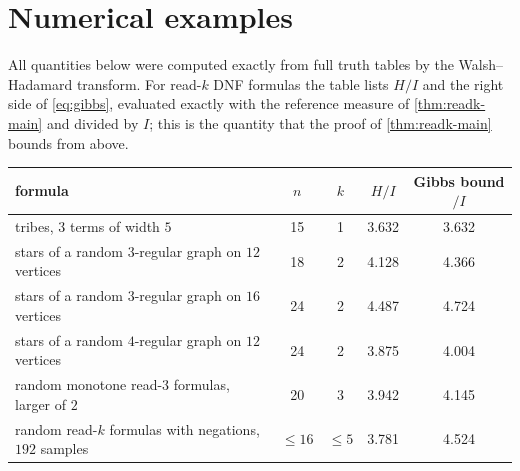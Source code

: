 \documentclass[11pt]{amsart}
\theoremstyle{definition}
\theoremstyle{remark}
\begin{document}
\section{Numerical examples}\label{sec:numerics}

All quantities below were computed exactly from full truth tables by the Walsh--Hadamard transform. For read-$k$
DNF formulas the table lists $H/I$ and the right side of \eqref{eq:gibbs}, evaluated exactly with the reference
measure of \cref{thm:readk-main} and divided by $I$; this is the quantity that the proof of \cref{thm:readk-main}
bounds from above.

\begin{center}
\begin{tabular}{lcccc}
\toprule
formula & $n$ & $k$ & $H/I$ & Gibbs bound $/I$ \\
\midrule
tribes, $3$ terms of width $5$ & 15 & 1 & 3.632 & 3.632\\
stars of a random $3$-regular graph on $12$ vertices & 18 & 2 & 4.128 & 4.366\\
stars of a random $3$-regular graph on $16$ vertices & 24 & 2 & 4.487 & 4.724\\
stars of a random $4$-regular graph on $12$ vertices & 24 & 2 & 3.875 & 4.004\\
random monotone read-$3$ formulas, larger of $2$ & 20 & 3 & 3.942 & 4.145\\
random read-$k$ formulas with negations, $192$ samples & $\le16$ & $\le5$ & 3.781 & 4.524\\
\bottomrule
\end{tabular}
\end{center}
\end{document}
